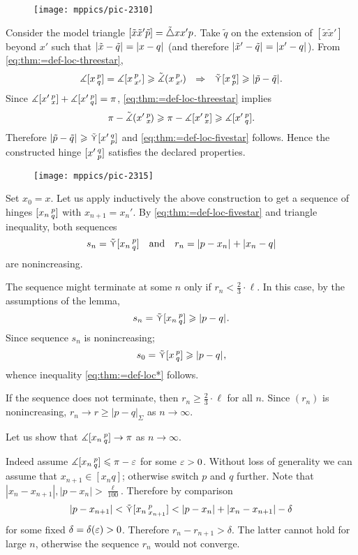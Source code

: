 \begin{wrapfigure}{r}{35mm}
\vskip -4mm
\centering
\texttt{[image: mppics/pic-2310]}
\end{wrapfigure}

Consider the model triangle
$\trig{\tilde x}{\tilde x'}{\tilde p}\z=\modtrig xx'p$.
Take $\tilde  q$ on the extension of $[\tilde  x\tilde  x']$ beyond $x'$ such that $\dist{\tilde x}{\tilde q}{}=\dist{x}{q}{}$ (and therefore $\dist{\tilde x'}{\tilde q}{}=\dist{x'}{q}{}$).
From \ref{eq:thm:=def-loc-threestar},
\[\measuredangle\hinge x p q
=\measuredangle\hinge  x p{x'}\ge\angk x p{x'}\ \ \Rightarrow\ \ 
\side \hinge x q p\ge\dist{\tilde p}{\tilde q}{}.\]
Since $\measuredangle[x'\,{}^{p}_{x}]+\measuredangle[x'\,{}^{p}_{q}]= \pi$,
\ref{eq:thm:=def-loc-threestar} implies
\[
\pi
-\tilde\measuredangle(x'\,{}^{p}_{x}\hspace{-0.2ex})
\geqslant
\pi-\measuredangle[x'\,{}^{p}_{x}]
\geqslant
\measuredangle[x'\,{}^{p}_{q}].
\]
Therefore
$\dist{\tilde p}{\tilde q}{}\ge\side \hinge{x'}q p$ and \ref{eq:thm:=def-loc-fivestar} follows.
Hence the constructed hinge $[x'\,{}^{q}_{p}]$ satisfies the declared properties.

\begin{figure}[h!]
\centering
\texttt{[image: mppics/pic-2315]}
\end{figure}

Set $x_0=x$.
Let us apply inductively the above construction to get a sequence of hinges  $[x_n\,{}^{p}_{q}]$ with $x_{n+1}=x_n'$.
By \ref{eq:thm:=def-loc-fivestar} and triangle inequality, both sequences
\[s_n=\side \hinge{x_n}pq\quad\text{and}\quad r_n=\dist{p}{x_n}{}+\dist{x_n}{q}{}\]
are nonincreasing.

The sequence might terminate at some $n$ only if $r_n< \tfrac{2}{3}\cdot\ell $.
In this case, by the assumptions of the lemma, 
\[s_n=\side \hinge{x_n}p q\ge\dist{p}{q}{}.\]
Since sequence $s_n$ is nonincreasing;
\[s_0=\side \hinge{x}p q\ge\dist{p}{q}{},\]
whence inequality \ref{eq:thm:=def-loc*} follows.

If the sequence does not terminate, then $r_n\ge\tfrac{2}{3}\cdot\ell$ for all $n$.
Since $(r_n)$ is nonincreasing, $r_n\to r\ge |p-q|_\Sigma$ as $n\to\infty$.

Let us show that $\measuredangle[x_n\,{}^{p}_{q}]\to \pi$ as $n\to\infty$.

Indeed assume $\measuredangle[x_n\,{}^{p}_{q}]\leqslant \pi-\varepsilon$ for some $\varepsilon>0$.
Without loss of generality we can assume that $x_{n+1}\in [x_nq]$;
otherwise switch $p$ and $q$ further.
Note that $|x_n-x_{n+1}|,|p-x_n|>\tfrac\ell{100}$.
Therefore by comparison 
\[|p-x_{n+1}|<\side\hinge{x_n}p{x_{n+1}}<|p-x_n|+|x_n-x_{n+1}|-\delta\]
for some fixed $\delta=\delta(\varepsilon)>0$.
Therefore $r_n-r_{n+1}>\delta$.
The latter cannot hold for large $n$, otherwise the sequence $r_n$ would not converge.

